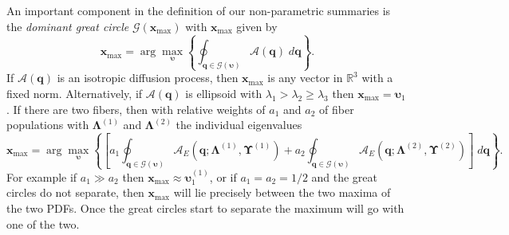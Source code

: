 \documentclass[dvips,aoas,preprint]{imsart}
\numberwithin{equation}{section}
\theoremstyle{plain}
\newcommand{\q}{\mathbf{q}}
\newcommand{\bu}{\bs{\upsilon}}
\newcommand{\x}{\mathbf{x}}
\newcommand{\cA}{\mathcal{A}}
\newcommand{\cG}{\mathcal{G}}
\newcommand{\bs}[1]{\boldsymbol{#1}}
\begin{document}
An important component in the definition of our non-parametric
summaries is the {\em dominant great circle} $\cG(\x_\text{max})$ with
$\x_\text{max}$ given by
\begin{equation}
  \x_\text{max}=\arg \max_{\bu}\left\{ \oint_{\q\in\cG(\bu)}
  {\cA}\left(\q\right)\;d\q \right\}.
\end{equation}
If ${\cA}\left(\q\right)$ is an isotropic diffusion process, then
$\x_\text{max}$ is any vector in ${\mathbb{R}}^3$ with a fixed norm.
Alternatively, if ${\cA}\left(\q\right)$ is ellipsoid with
$\lambda_1>\lambda_2\ge \lambda_3$ then $\x_\text{max}=\bu_1$.  If
there are two fibers, then with relative weights of $a_1$ and $a_2$ of
fiber populations with $\bs{\Lambda}^{(1)}$ and $\bs{\Lambda}^{(2)}$
the individual eigenvalues
{\tiny \begin{equation}
  \x_\text{max} = \arg \max_{\bu}\left\{\left[ a_1
    \oint_{\q\in\cG(\bu)}
    {\cA}_E\left(\q;\bs{\Lambda}^{(1)},\bs{\Upsilon}^{(1)}\right) + a_2
    \oint_{\q\in\cG(\bu)}
    {\cA}_E\left(\q;\bs{\Lambda}^{(2)},\bs{\Upsilon}^{(2)}\right)\right]\;d\q
    \right\}.
\end{equation}}
For example if $a_1\gg{a_2}$ then $\x_\text{max}\approx\bu_1^{(1)}$,
or if $a_1=a_2=1/2$ and the great circles do not separate, then
$\x_\text{max}$ will lie precisely between the two maxima of the two
PDFs.  Once the great circles start to separate the maximum will go
with one of the two.
\end{document}
